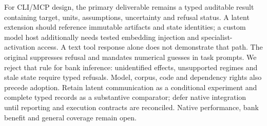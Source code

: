 For CLI/MCP design, the primary deliverable remains a typed auditable result containing target, units, assumptions, uncertainty and refusal status. A latent extension should reference immutable artifacts and state identities; a custom model host additionally needs tested embedding injection and specialist-activation access. A text tool response alone does not demonstrate that path. The original suppresses refusal and mandates numerical guesses in task prompts. We reject that rule for bank inference: unidentified effects, unsupported regimes and stale state require typed refusals. Model, corpus, code and dependency rights also precede adoption. Retain latent communication as a conditional experiment and complete typed records as a substantive comparator; defer native integration until reporting and execution contracts are reconciled. Native performance, bank benefit and general coverage remain open.\citep{exec24_collaboration_original,exec24_collaboration_reference}
